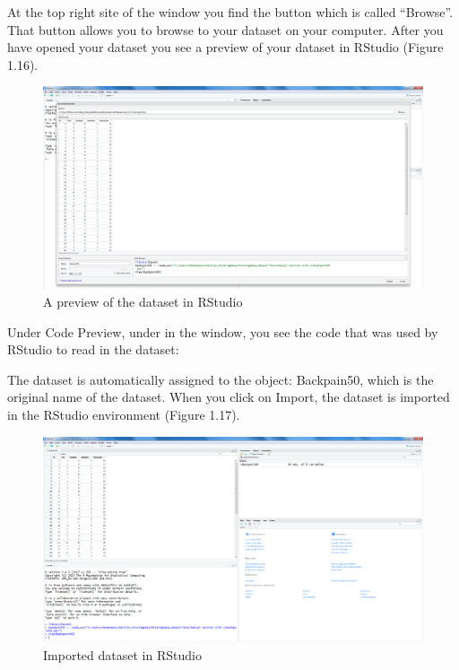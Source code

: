 \documentclass[]{book}
\theoremstyle{definition}
\theoremstyle{definition}
\theoremstyle{definition}
\theoremstyle{remark}
\begin{document}
At the top right site of the window you find the button which is called
``Browse''. That button allows you to browse to your dataset on your
computer. After you have opened your dataset you see a preview of your
dataset in RStudio (Figure 1.16).

\begin{figure}

{\centering \includegraphics[width=0.9\linewidth]{images/fig1.16} 

}

\caption{A preview of the dataset in RStudio}\label{fig:fig16}
\end{figure}

Under Code Preview, under in the window, you see the code that was used
by RStudio to read in the dataset:

The dataset is automatically assigned to the object: Backpain50, which
is the original name of the dataset. When you click on Import, the
dataset is imported in the RStudio environment (Figure 1.17).

\begin{figure}

{\centering \includegraphics[width=0.9\linewidth]{images/fig1.17} 

}

\caption{Imported dataset in RStudio}\label{fig:fig17}
\end{figure}
\end{document}
